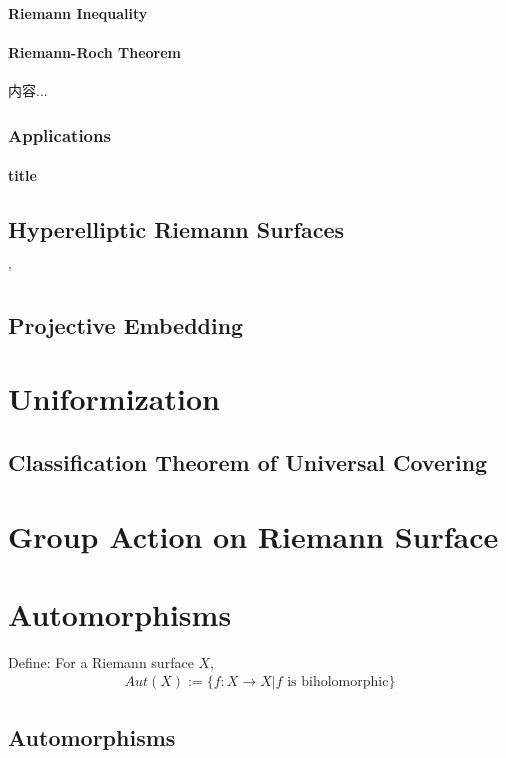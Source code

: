 \documentclass[Total.tex]{subfiles}
\begin{document}
				\subsubsection{Riemann Inequality}
				\subsubsection{Riemann-Roch Theorem}
				
					\begin{theorem}
						内容...
					\end{theorem}
			\subsection{Applications}
				\subsubsection{title}
		\section{Hyperelliptic Riemann Surfaces}'
		
		\section{Projective Embedding}
	\chapter{Uniformization}
		\section{Classification Theorem of Universal Covering}
	\chapter{Group Action on Riemann Surface}
	\chapter{Automorphisms}
		\begin{Def}
			Define: For a Riemann surface $X$,
			\begin{gather*}
				Aut(X):=\{f:X\rightarrow X|f\mbox{ is biholomorphic}\}
			\end{gather*}
		\end{Def}
		\section{Automorphisms}
\end{document}
